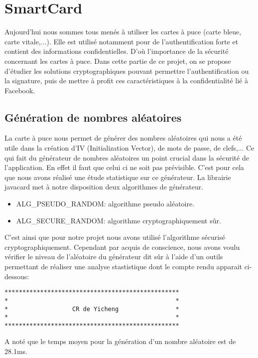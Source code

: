 \documentclass[a4paper,11pt,french]{article}
\begin{document}
\section{SmartCard}
Aujourd'hui nous sommes tous menés à utiliser les cartes à puce (carte bleue, carte vitale,...). 
Elle est utilisé notamment pour de l'authentification forte et contient des informations confidentielles.
D'où l'importance de la sécurité concernant les cartes à puce.
Dans cette partie de ce projet, on se propose d'étudier les solutions cryptographiques pouvant
permettre l'authentification ou la signature, puis de mettre à profit ces caractéristiques
à la confidentialité lié à Facebook.


\subsection{Génération de nombres aléatoires}
La carte à puce nous permet de générer des nombres aléatoires qui nous a été utile dans la création d'IV (Initialization Vector),
de mots de passe, de clefs,... Ce qui fait du générateur de nombres aléatoires un point crucial dans la sécurité de l'application.
En effet il faut que celui ci ne soit pas prévisible. C'est pour cela que nous avons réalisé une étude statistique sur ce générateur.
La librairie javacard met à notre disposition deux algorithmes de générateur. 
\begin{itemize} 
	\item ALG\_PSEUDO\_RANDOM: algorithme pseudo aléatoire.
	\item ALG\_SECURE\_RANDOM: algorithme cryptographiquement sûr.
\end{itemize}

C'est ainsi que pour notre projet nous avons utilisé l'algorithme sécurisé cryptographiquement. Cependant
par acquis de conscience, nous avons voulu vérifier le niveau de l'aléatoire du générateur dit sûr à l'aide d'un
outils permettant de réaliser une analyse stastistique dont le compte rendu apparait ci-dessous:

\begin{verbatim}
*************************************************
*                                               *
*                  CR de Yicheng                *
*                                               *
*************************************************
\end{verbatim}


A noté que le temps moyen pour la génération d'un nombre aléatoire est de 28.1ms.
\end{document}
